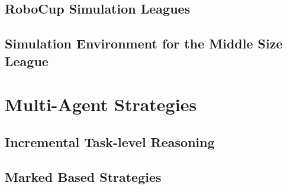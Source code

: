 \subsection{RoboCup Simulation Leagues}
\subsection{Simulation Environment for the Middle Size League}

\section{Multi-Agent Strategies}
\subsection{Incremental Task-level Reasoning}
\subsection{Marked Based Strategies}
